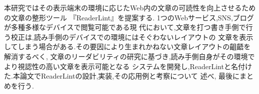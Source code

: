 \begin{jabstract}
本研究ではその表示端末の環境に応じたWeb内の文章の可読性を向上させるための文章の整形ツール
『ReaderLint』を提案する. 1つのWebサービス,SNS,ブログが多種多様なデバイスで閲覧可能である現
代において,文章を打つ書き手側で行う校正は,読み手側のデバイスでの環境にはそぐわないレイアウトの
文章を表示してしまう場合がある.その要因により生まれかねない文章レイアウトの齟齬を解消するべく,
文章のリーダビリティの研究に基づき,読み手側自身がその環境でより視認性の高い文章を表示可能となる
システムを開発し,ReaderLintと名付けた.本論文でReaderLintの設計,実装,その応用例と考察について
述べ, 最後にまとめを行う.
\end{jabstract}


